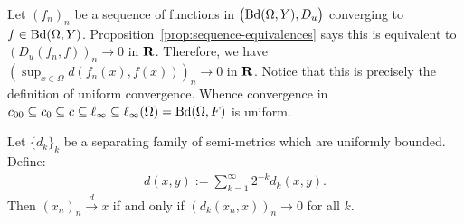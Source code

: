     \begin{example}
        Let $(f_n)_n$ be a sequence of functions in $\bigl(\operatorname{Bd}(\Omega,Y),D_u\bigr)$ converging to $f \in \operatorname{Bd}(\Omega,Y)$. Proposition~\ref{prop:sequence-equivalences} says this is equivalent to $(D_u(f_n,f))_n \rightarrow 0$ in $\mathbf{R}$. Therefore, we have $(\sup_{x \in \Omega}d(f_n(x),f(x)))_n \rightarrow 0$ in $\mathbf{R}$. Notice that this is precisely the definition of uniform convergence. Whence convergence in $c_{00} \subseteq c_0 \subseteq c \subseteq \ell_\infty \subseteq \ell_{\infty}(\Omega) = \operatorname{Bd}(\Omega,F)$ is uniform.
    \end{example}

    \begin{proposition}
        Let $\{d_k\}_k$ be a separating family of semi-metrics which are uniformly bounded. Define:
            \begin{equation*}
            \begin{split}
                d(x,y) := \sum_{k = 1}^\infty 2^{-k}d_k(x,y).
            \end{split}
            \end{equation*}
        Then $(x_n)_n \xrightarrow{d} x$ if and only if $(d_k(x_n,x))_n \rightarrow 0$ for all $k$.
    \end{proposition}
